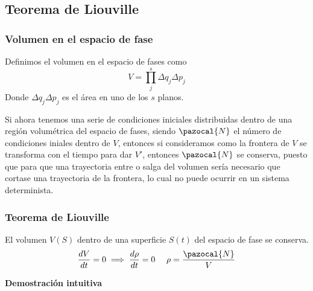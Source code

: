 \subsection{Teorema de Liouville} 
\subsubsection{Volumen en el espacio de fase}
Definimos el volumen en el espacio de fases como
\begin{equation} \label{4.3.1}
    V = \prod_j^s \Delta q_j \Delta p_j
\end{equation} 
Donde $\Delta q_j \Delta p_j$ es el área en uno de los $s$ planos.

Si ahora tenemos una serie de condiciones iniciales distribuidas dentro de una región volumétrica del espacio de fases, siendo $\pazocal{N}$ el número de condiciones iniales dentro de $V$, entonces si consideramos como la frontera de $V$ se transforma con el tiempo para dar $V'$, entonces $\pazocal{N}$ se conserva, puesto que para que una trayectoria entre o salga del volumen sería necesario que cortase una trayectoria de la frontera, lo cual no puede ocurrir en un sistema determinista.
\subsubsection{Teorema de Liouville} 
El volumen $V(S)$ dentro de una superficie $S(t)$ del espacio de fase se conserva.
\begin{equation} \label{4.3.2}
    \frac{dV}{dt}=0 \implies \frac{d\rho}{dt} = 0 \ \ \ \ \rho = \frac{\pazocal{N}}{V}
\end{equation} 

\textbf{Demostración intuitiva}

